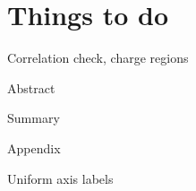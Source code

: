 \chapter{Things to do}
\begin{compactitem}
	\item Correlation check, charge regions
	\item Abstract
	\item Summary
	\item Appendix
	\item Uniform axis labels
\end{compactitem}